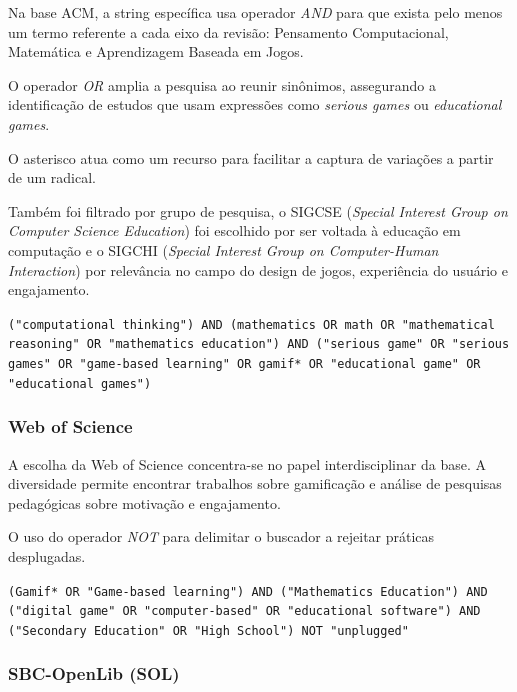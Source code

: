 \documentclass[12pt]{article}
\begin{document}
Na base ACM, a string específica usa operador \textit{AND} para que exista pelo menos um termo referente a cada eixo da revisão: Pensamento Computacional, Matemática e Aprendizagem Baseada em Jogos.

O operador \textit{OR} amplia a pesquisa ao reunir sinônimos, assegurando a identificação de estudos que usam expressões como \textit{serious games} ou \textit{educational games}.

O asterisco atua como um recurso para facilitar a captura de variações a partir de um radical.

Também foi filtrado por grupo de pesquisa, o SIGCSE (\textit{Special Interest Group on Computer Science Education}) foi escolhido por ser voltada à educação em computação e o SIGCHI (\textit{Special Interest Group on Computer-Human Interaction}) por relevância no campo do design de jogos, experiência do usuário e engajamento.

\begin{center}
\texttt{("computational thinking") AND (mathematics OR math OR "mathematical reasoning" OR "mathematics education") AND ("serious game" OR "serious games" OR "game-based learning" OR gamif* OR "educational game" OR "educational games")} \\
\end{center}

\subsubsection{Web of Science}

A escolha da Web of Science concentra-se no papel interdisciplinar da base. A diversidade permite encontrar trabalhos sobre gamificação e análise de pesquisas pedagógicas sobre motivação e engajamento.

O uso do operador \textit{NOT} para delimitar o buscador a rejeitar práticas desplugadas.

\begin{center}
\texttt{(Gamif* OR "Game-based learning") AND ("Mathematics Education") AND ("digital game" OR "computer-based" OR "educational software") AND ("Secondary Education" OR "High School") NOT "unplugged"} \\
\end{center}

\subsubsection{SBC-OpenLib (SOL)}
\end{document}
